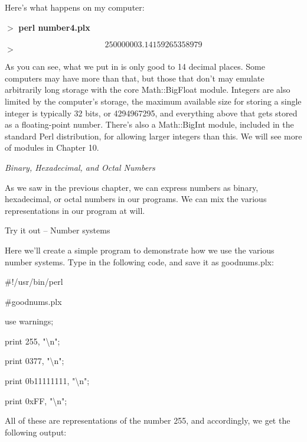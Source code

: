 \documentclass[a4paper,11pt]{book}
\begin{document}
\noindent 

\noindent Here's what happens on my computer:

\noindent 

\noindent $>$ \textbf{perl number4.plx}

\[25000000 3.14159265358979\] 
$>$

\noindent 

\noindent As you can see, what we put in is only good to 14 decimal places. Some computers may have more than that, but those that don't may emulate arbitrarily long storage with the core Math::BigFloat module. Integers are also limited by the computer's storage, the maximum available size for storing a single  integer is typically 32 bits, or 4294967295, and everything above that gets stored as a floating-point number. There's also a Math::BigInt module, included in the standard Perl distribution, for allowing larger integers than this. We will see more of modules in Chapter 10.

\noindent 

\noindent \textit{Binary, Hexadecimal, and Octal Numbers}

\noindent As we saw in the previous chapter, we can express numbers as binary, hexadecimal, or octal numbers in our programs. We can mix the various representations in our program at will.

\noindent 

\noindent 

\noindent Try it out -- Number systems

\noindent Here we'll create a simple program to demonstrate how we use the various number systems. Type in the following code, and save it as goodnums.plx:

\noindent 

\noindent 

\noindent \#!/usr/bin/perl

\noindent \#goodnums.plx

\noindent use warnings;

\noindent print 255, "\textbackslash n";

\noindent print 0377, "\textbackslash n";

\noindent print 0b11111111, "\textbackslash n";

\noindent print 0xFF, "\textbackslash n";

\noindent 

\noindent All of these are representations of the number 255, and accordingly, we get the following output:
\end{document}

